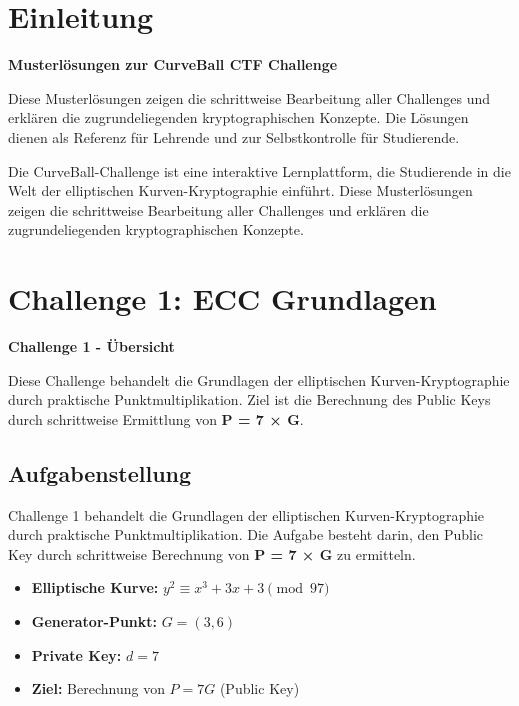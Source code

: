 \documentclass{article}
\begin{document}
\section{Einleitung}

\begin{infobox}
\textbf{Musterlösungen zur CurveBall CTF Challenge}

Diese Musterlösungen zeigen die schrittweise Bearbeitung aller Challenges und erklären die zugrundeliegenden kryptographischen Konzepte. Die Lösungen dienen als Referenz für Lehrende und zur Selbstkontrolle für Studierende.
\end{infobox}

Die CurveBall-Challenge ist eine interaktive Lernplattform, die Studierende in die Welt der elliptischen Kurven-Kryptographie einführt. Diese Musterlösungen zeigen die schrittweise Bearbeitung aller Challenges und erklären die zugrundeliegenden kryptographischen Konzepte.

\vspace{0.5cm}

\section{Challenge 1: ECC Grundlagen}

\begin{solutionbox}
\textbf{Challenge 1 - Übersicht}

Diese Challenge behandelt die Grundlagen der elliptischen Kurven-Kryptographie durch praktische Punktmultiplikation. Ziel ist die Berechnung des Public Keys durch schrittweise Ermittlung von \textbf{P = 7 × G}.
\end{solutionbox}

\subsection{Aufgabenstellung}
Challenge 1 behandelt die Grundlagen der elliptischen Kurven-Kryptographie durch praktische Punktmultiplikation. Die Aufgabe besteht darin, den Public Key durch schrittweise Berechnung von \textbf{P = 7 × G} zu ermitteln.

\begin{tcolorbox}[colback=thd-blue!10,colframe=thd-blue,title=\textbf{Gegebene Parameter}]
\begin{itemize}[leftmargin=1.5cm]
    \item \textbf{Elliptische Kurve:} $y^2 \equiv x^3 + 3x + 3 \pmod{97}$
    \item \textbf{Generator-Punkt:} $G = (3, 6)$
    \item \textbf{Private Key:} $d = 7$
    \item \textbf{Ziel:} Berechnung von $P = 7G$ (Public Key)
\end{itemize}
\end{tcolorbox}
\end{document}
